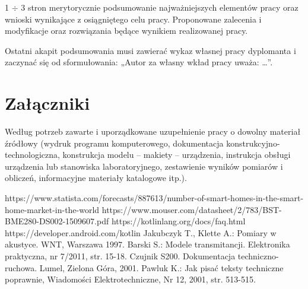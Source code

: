 \documentclass[12pt]{article}
\begin{document}
1 $\div$ 3 stron merytorycznie podsumowanie najważniejszych elementów pracy oraz wnioski wynikające z osiągniętego celu pracy. Proponowane zalecenia i modyfikacje oraz rozwiązania będące wynikiem realizowanej pracy.

Ostatni akapit podsumowania musi zawierać wykaz własnej pracy dyplomanta i zaczynać się od sformułowania: „Autor za własny wkład pracy uważa: \ldots”.

\clearpage

\section*{Załączniki}

Według potrzeb zawarte i uporządkowane uzupełnienie pracy o dowolny materiał źródłowy (wydruk programu komputerowego, dokumentacja kons\-truk\-cyj\-no-\-tech\-no\-lo\-gicz\-na, konstrukcja modelu -- makiety -- urządzenia, instrukcja obsługi urządzenia lub stanowiska laboratoryjnego, zestawienie wyników pomiarów i obliczeń, informacyjne materiały katalogowe itp.).


\clearpage


\begin{thebibliography}{4}
	 https://www.statista.com/forecasts/887613/number-of-smart-homes-in-the-smart-home-market-in-the-world
	 https://www.mouser.com/datasheet/2/783/BST-BME280-DS002-1509607.pdf
	 https://kotlinlang.org/docs/faq.html
	 https://developer.android.com/kotlin
	 Jakubczyk T., Klette A.: Pomiary w akustyce. WNT, Warszawa 1997.
	 Barski S.: Modele transmitancji. Elektronika praktyczna, nr 7/2011, str. 15-18.
	 Czujnik S200. Dokumentacja techniczno-ruchowa. Lumel, Zielona Góra, 2001.
	 Pawluk K.: Jak pisać teksty techniczne poprawnie, Wiadomości Elektrotechniczne, Nr 12, 2001, str. 513-515.
\end{thebibliography}

\clearpage

\makesummary
\end{document}
